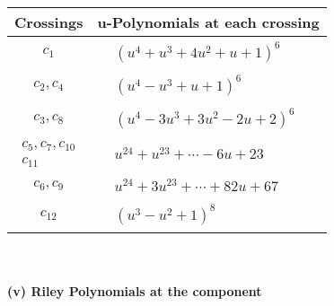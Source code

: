\documentclass[1p]{elsarticle_modified}
\theoremstyle{definition}
\begin{document}
\begin{tabular}{m{50pt}|m{274pt}}
Crossings & \hspace{64pt}u-Polynomials at each crossing \\
\hline $$\begin{aligned}c_{1}\end{aligned}$$&$\begin{aligned}
&(u^4+u^3+4 u^2+u+1)^6
\end{aligned}$\\
\hline $$\begin{aligned}c_{2},c_{4}\end{aligned}$$&$\begin{aligned}
&(u^4- u^3+u+1)^6
\end{aligned}$\\
\hline $$\begin{aligned}c_{3},c_{8}\end{aligned}$$&$\begin{aligned}
&(u^4-3 u^3+3 u^2-2 u+2)^6
\end{aligned}$\\
\hline $$\begin{aligned}c_{5},c_{7},c_{10}\\c_{11}\end{aligned}$$&$\begin{aligned}
&u^{24}+u^{23}+\cdots-6 u+23
\end{aligned}$\\
\hline $$\begin{aligned}c_{6},c_{9}\end{aligned}$$&$\begin{aligned}
&u^{24}+3 u^{23}+\cdots+82 u+67
\end{aligned}$\\
\hline $$\begin{aligned}c_{12}\end{aligned}$$&$\begin{aligned}
&(u^3- u^2+1)^8
\end{aligned}$\\
\hline
\end{tabular}\\~\\
\newpage\renewcommand{\arraystretch}{1}
\flushleft \textbf{(v) Riley Polynomials at the component}\newline \\
\end{document}
